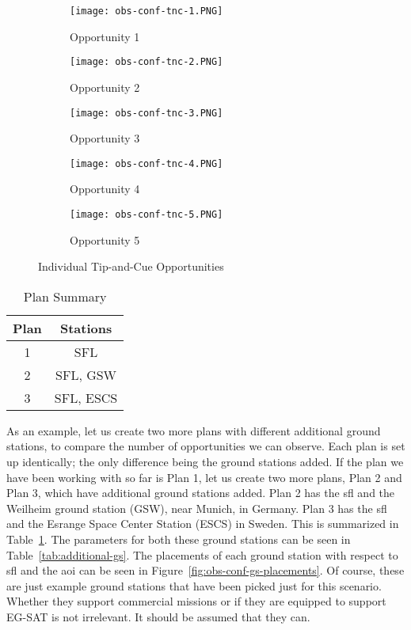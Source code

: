 \begin{figure}[h]
    \centering
    \begin{subfigure}[b]{0.32\textwidth}
	\centering
	\texttt{[image: obs-conf-tnc-1.PNG]} 
	\caption{Opportunity 1}
	\label{fig:obs-conf-tnc-1} 
    \end{subfigure}
    \hfill
    \begin{subfigure}[b]{0.32\textwidth}
	\centering
	\texttt{[image: obs-conf-tnc-2.PNG]} 
	\caption{Opportunity 2}
	\label{fig:obs-conf-tnc-2} 
    \end{subfigure}
    \hfill
    \begin{subfigure}[b]{0.32\textwidth}
	\centering
	\texttt{[image: obs-conf-tnc-3.PNG]} 
	\caption{Opportunity 3}
	\label{fig:obs-conf-tnc-3} 
    \end{subfigure}
    
    \begin{subfigure}[b]{0.32\textwidth}
	\centering
	\texttt{[image: obs-conf-tnc-4.PNG]} 
	\caption{Opportunity 4}
	\label{fig:obs-conf-tnc-4} 
    \end{subfigure}
    \quad \quad
    \begin{subfigure}[b]{0.32\textwidth}
	\centering
	\texttt{[image: obs-conf-tnc-5.PNG]} 
	\caption{Opportunity 5}
	\label{fig:obs-conf-tnc-5} 
    \end{subfigure}

    \caption{Individual Tip-and-Cue Opportunities}
\label{fig:obs-conf-tnc-opps}
\end{figure}

\begin{table}[h] 
    \centering
    \caption{Plan Summary}
    \begin{tabular}{cc}
	Plan & Stations \\ \hline
	1   &	SFL \\
	2   &	SFL, GSW \\
	3   &	SFL, ESCS 
    \end{tabular}
    \label{tab:additional-plans}
\end{table}

As an example, let us create two more plans with different additional ground
stations, to compare the number of opportunities we can observe. Each plan is
set up identically; the only difference being the ground stations added. If the
plan we have been working with so far is Plan 1, let us create two more plans,
Plan 2 and Plan 3, which have additional ground stations added.  Plan 2 has the
\gls{sfl} and the Weilheim ground station (GSW), near Munich, in Germany. Plan
3 has the \gls{sfl} and the Esrange Space Center Station (ESCS) in Sweden. This
is summarized in Table~\ref{tab:additional-plans}. The parameters for both
these ground stations can be seen in Table~\ref{tab:additional-gs}. The
placements of each ground station with respect to \gls{sfl} and the \gls{aoi}
can be seen in Figure~\ref{fig:obs-conf-gs-placements}. Of course, these are
just example ground stations that have been picked just for this scenario.
Whether they support commercial missions or if they are equipped to support
EG-SAT is not irrelevant. It should be assumed that they can. 

